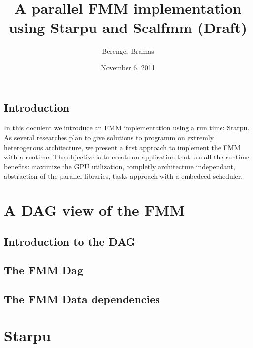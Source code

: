\documentclass[12pt,letterpaper,titlepage]{report}
\author{Berenger Bramas}
\title{A parallel FMM implementation using Starpu and Scalfmm (Draft)}
\date{November 6, 2011}
\begin{document}
\maketitle{}
\newpage
\tableofcontents
\newpage
\section{Introduction}
In this doculent we introduce an FMM implementation using a run time: Starpu.
As several researches plan to give solutions to programm on extremly heterogenous architecture,
we present a first approach to implement the FMM with a runtime.
The objective is to create an application that use all the runtime benefits:
maximize the GPU utilization, completly architecture independant, abstraction of the parallel libraries,
tasks approach with a embedeed scheduler.

\chapter{A DAG view of the FMM}
\section{Introduction to the DAG}

\section{The FMM Dag}

\section{The FMM Data dependencies}


\chapter{Starpu}
\end{document}
